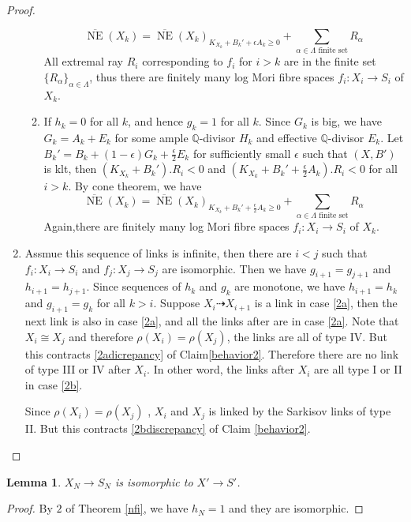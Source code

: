 \documentclass{article}
\newtheorem{lem}[defn]{Lemma}
\begin{document}
\begin{proof}
\begin{enumerate}
\begin{enumerate}
  \[
    \overline{\operatorname{NE}}(X_{k})=\overline{\operatorname{NE}}(X_{k})_{K_{X_{k}}+B_{k}'+\epsilon A_{k}\geqslant 0} +\sum_{\alpha \in\Lambda\text{ finite set}}R_{\alpha}
  \]
  All extremal ray $R_{i}$ corresponding to $f_{i}$ for $i>k$ are in the finite set $\{R_{\alpha}\}_{\alpha \in \Lambda} $, thus there are finitely many log Mori fibre spaces $f_{i}:X_{i}\to S_{i}$ of $X_{k}$.
\item If $h_{k}=0$ for all $k$, and hence $g_{k}=1$ for all $k$. Since $G_{k}$ is big, we have $G_{k}=A_{k}+E_{k}$ for some ample $\mathbb{Q}$-divisor $H_{k}$ and effective $\mathbb{Q}$-divisor  $E_{k}$. Let $B_{k}'=B_{k}+(1-\epsilon)G_{k}+\frac{\epsilon}{2} E_{k}$ for sufficiently small $\epsilon$ such that $(X,B')$ is klt, then $(K_{X_{k}}+B_{k}').R_{i}<0$ and $(K_{X_{k}}+B_{k}'+\frac{\epsilon}{2} A_{k}).R_{i}<0$ for all $i>k$. By cone theorem, we have 
\[
    \overline{\operatorname{NE}}(X_{k})=\overline{\operatorname{NE}}(X_{k})_{K_{X_{k}}+B_{k}'+\frac{\epsilon}{2}A_{k}\geqslant 0} +\sum_{\alpha \in\Lambda\text{ finite set}}R_{\alpha}
  \]
  Again,there are finitely many log Mori fibre spaces $f_{i}:X_{i}\to S_{i}$ of $X_{k}$.

\end{enumerate}
\item Assmue this sequence of links is infinite, then there are $i<j$ such that $f_{i}:X_{i}\to S_{i}  $ and $f_{j}:X_{j}\to S_{j}$ are isomorphic. Then we have $g_{i+1}=g_{j+1}$ and $h_{i+1}=h_{j+1}$. Since sequences of $h_{k}$ and $g_{k}$ are monotone, we have $h_{i+1}=h_{k}$ and  $g_{i+1}=g_{k}$ for all $k>i$. Suppose $X_{i}\dashrightarrow X_{i+1}$ is a link in case \ref{2a}, then the next link is also in case \ref{2a}, and all the links after are in case \ref{2a}. Note that $X_{i}\cong X_{j}$ and therefore $\rho(X_{i})=\rho(X_{j})$, the links are all of type IV. But this contracts  \ref{2adicrepancy} of Claim\ref{behavior2}. Therefore there are no link of type III or IV after $X_{i}$. In other word, the links after $X_{i}$ are all type I or II in case \ref{2b}.

  Since $\rho(X_{i})= \rho(X_{j})$ , $X_{i}$  and $X_{j}$ is linked by  the Sarkisov links of type II. But this contracts  \ref{2bdiscrepancy} of  Claim \ref{behavior2}.
\end{enumerate}  
\end{proof}
\begin{lem}\label{nfi2}
$X_{N}\to S_{N}$ is isomorphic to $X'\to S'$. 
\end{lem}
\begin{proof}
  By $2$ of Theorem \ref{nfi}, we have $h_{N}=1$ and they are isomorphic.
\end{proof}
\end{document}
